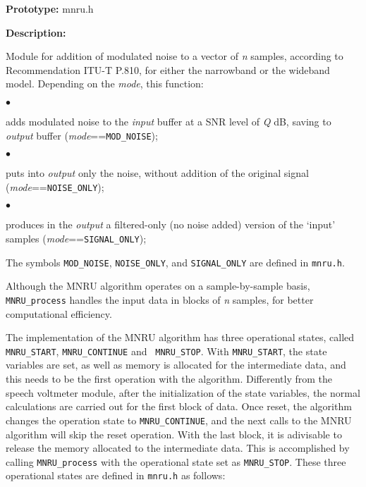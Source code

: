 {\bf Prototype: }    mnru.h

{\bf Description: }

Module for addition of modulated noise to a vector of {\it n} samples,
according to Recommendation ITU-T P.810, for either the narrowband or
the wideband model. Depending on the {\it mode}, this function:

\begin{minipage}{130mm}
 $\bullet$ \parbox[t]{120mm}{
           adds modulated noise to the {\it input} buffer at a SNR level of
          {\it Q} dB, saving to {\it output} buffer
          ({\it mode}=={\tt MOD\_NOISE});\\}

 $\bullet$ \parbox[t]{120mm}{
          puts into {\it output} only the noise, without addition of the
          original signal ({\it mode}=={\tt NOISE\_ONLY});\\}

 $\bullet$ \parbox[t]{120mm}{
          produces in the {\it output} a filtered-only (no noise added)
          version of the `input' samples
          ({\it mode}=={\tt SIGNAL\_ONLY});\\}

\end{minipage}

The symbols {\tt MOD\_NOISE}, {\tt NOISE\_ONLY}, and {\tt SIGNAL\_ONLY}
are defined in {\tt mnru.h}.

Although the MNRU algorithm operates on a sample-by-sample basis,
{\tt MNRU\_process} handles the input data in blocks of {\it n}
samples, for better computational efficiency.

The implementation of the MNRU algorithm has three operational
states, called {\tt MNRU\_START}, {\tt MNRU\_CONTINUE} and {\tt
MNRU\_STOP}. With {\tt MNRU\_START}, the state variables are set, as
well as memory is allocated for the intermediate  data, and this
needs to be the first operation with the algorithm. Differently from
the speech voltmeter module, after the initialization of the state
variables, the normal calculations are carried out for the first
block of data. Once reset, the algorithm changes the operation state
to {\tt MNRU\_CONTINUE}, and the next calls to the MNRU algorithm
will skip the reset operation. With the last block, it is adivisable to
release the memory allocated to the intermediate data. This is
accomplished by calling {\tt MNRU\_process} with the operational
state set as {\tt MNRU\_STOP}. These three operational states are
defined in {\tt mnru.h} as follows:

